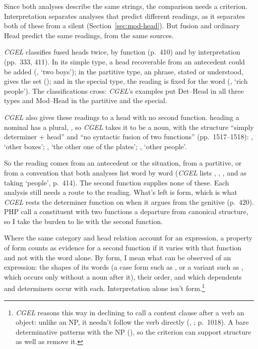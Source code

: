Since both analyses describe the same strings, the comparison needs a criterion. Interpretation separates analyses that predict different readings, as it separates both of these from a silent  (Section~\ref{sec:mod-head}). But fusion and ordinary Head predict the same readings, from the same sources.

\textit{CGEL} classifies fused heads twice, by function (p.~410) and by interpretation (pp.~333, 411). In its simple type, a head recoverable from an antecedent could be added (, \enquote*{two boys}); in the partitive type, an  phrase, stated or understood, gives the set (); and in the special type, the reading is fixed for the word (, \enquote*{rich people}). The classifications cross: \textit{CGEL}'s examples put Det--Head in all three types and Mod--Head in the partitive and the special.

\textit{CGEL} also gives these readings to a head with no second function.  heading a nominal has a plural, , so \textit{CGEL} takes it to be a noun, with the structure \enquote{simply determiner + head} and \enquote{no syntactic fusion of two functions} (pp.~1517--1518): , \enquote*{other boxes}; , \enquote*{the other one of the plates}; , \enquote*{other people}.

So the reading comes from an antecedent or the situation, from a partitive, or from a convention that both analyses list word by word (\textit{CGEL} lists , , , and  as taking \enquote*{people}, p.~414). The second function supplies none of these. Each analysis still needs a route to the reading. What's left is form, which is what \textit{CGEL} rests the determiner function on when it argues from the genitive (p.~420). PHP call a constituent with two functions a departure from canonical structure, so I take the burden to lie with the second function.

Where the same category and head relation account for an expression, a property of form counts as evidence for a second function if it varies with that function and not with the word alone. By form, I mean what can be observed of an expression: the shapes of its words (a case form such as , or a variant such as , which occurs only without a noun after it), their order, and which dependents and determiners occur with each. Interpretation alone isn't form.\footnote{\textit{CGEL} reasons this way in declining to call a content clause after a verb an object: unlike an NP, it needn't follow the verb directly (, ; p.~1018). A bare determinative patterns with the NP (), so the criterion can support structure as well as remove it.}


